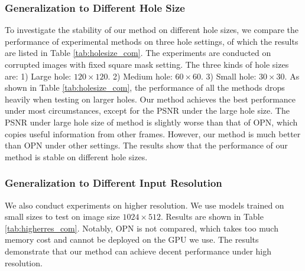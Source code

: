 \subsubsection{Generalization to  Different Hole Size}
{\color{blue}	To investigate the stability of our method on different hole sizes, we compare the performance of experimental methods on three hole settings, of which the results are listed in Table \ref{tab:holesize_com}. The experiments are conducted on corrupted images with fixed square mask setting. The three kinds of hole sizes are: 1) Large hole: $120\times120$. 2) Medium hole: $60\times60$. 3) Small hole: $30\times30$. As shown in Table \ref{tab:holesize_com}, the performance of all the methods drops heavily when testing on larger holes. Our method achieves the best performance under most circumstances, except for the PSNR under the large hole size. The PSNR under large hole size of method is slightly worse than that of OPN, which copies useful information from other frames. However, our method is much better than OPN under other settings. The results show that the performance of our method is stable on different hole sizes.

\subsubsection{Generalization to  Different Input Resolution}
We also conduct experiments on higher resolution. We use models trained on small sizes to test on image size $1024\times512$. Results are shown in Table \ref{tab:higherres_com}. Notably, OPN is not compared, which takes too much memory cost and cannot be deployed on the GPU we use. The results demonstrate that our method can achieve decent performance under high resolution. 
}
 

